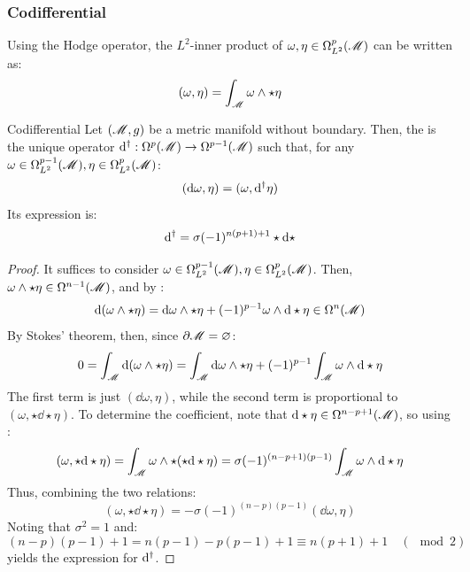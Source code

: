 \subsubsection{Codifferential}

Using the Hodge operator, the $ L^2 $-inner product of $ \omega , \eta \in \Omega_{L^2}^{p}(\mathscr{M}) $ can be written as:
\begin{equation}
  (\omega,\eta) = \int_\mathscr{M} \omega \wedge \star \eta
\end{equation}

\begin{proposition}{Codifferential}{}
  Let $ (\mathscr{M},g) $ be a metric manifold without boundary. Then, the  is the unique operator $ \mathrm{d}^\dagger : \Omega^{p}(\mathscr{M}) \rightarrow \Omega^{p-1}(\mathscr{M}) $ such that, for any $ \omega \in \Omega_{L^2}^{p-1}(\mathscr{M}) , \eta \in \Omega_{L^2}^{p}(\mathscr{M}) $:
  \begin{equation}
    (\mathrm{d} \omega , \eta) = (\omega , \mathrm{d}^\dagger \eta)
  \end{equation}
  Its expression is:
  \begin{equation}
    \mathrm{d}^\dagger = \sigma (-1)^{n(p+1)+1} \star \mathrm{d} \star
  \end{equation}
\end{proposition}

\begin{proofbox}
  \begin{proof}
    It suffices to consider $ \omega \in \Omega_{L^2}^{p-1}(\mathscr{M}) , \eta \in \Omega_{L^2}^{p}(\mathscr{M}) $. Then, $ \omega \wedge \star \eta \in \Omega^{n-1}(\mathscr{M}) $, and by :
    \begin{equation*}
      \mathrm{d} (\omega \wedge \star \eta) = \mathrm{d} \omega \wedge \star \eta + (-1)^{p-1} \omega \wedge \mathrm{d} \star \eta \in \Omega^{n}(\mathscr{M})
    \end{equation*}
    By Stokes' theorem, then, since $ \partial \mathscr{M} = \varnothing $:
    \begin{equation*}
      0 = \int_\mathscr{M} \mathrm{d} (\omega \wedge \star \eta) = \int_\mathscr{M} \mathrm{d} \omega \wedge \star \eta + (-1)^{p-1} \int_\mathscr{M} \omega \wedge \mathrm{d} \star \eta
    \end{equation*}
    The first term is just $ (\dd \omega , \eta) $, while the second term is proportional to $ (\omega , \star \dd \star \eta) $. To determine the coefficient, note that $ \mathrm{d} \star \eta \in \Omega^{n-p+1}(\mathscr{M}) $, so using :
    \begin{equation*}
      (\omega , \star \mathrm{d} \star \eta) = \int_\mathscr{M} \omega \wedge \star (\star \mathrm{d} \star \eta) = \sigma (-1)^{(n-p+1)(p-1)} \int_\mathscr{M} \omega \wedge \mathrm{d} \star \eta
    \end{equation*}
    Thus, combining the two relations:
    \begin{equation*}
      (\omega , \star \dd \star \eta) = - \sigma (-1)^{(n-p)(p-1)} (\dd \omega , \eta)
    \end{equation*}
    Noting that $ \sigma^2 = 1 $ and:
    \begin{equation*}
      (n-p)(p-1) + 1 = n (p-1) - p (p - 1) + 1 \equiv n (p + 1) + 1 \quad (\mod 2)
    \end{equation*}
    yields the expression for $ \mathrm{d}^\dagger $.
  \end{proof}
\end{proofbox}

